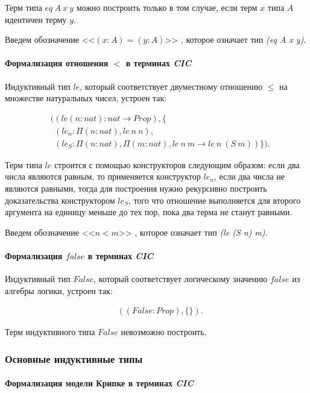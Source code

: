 \documentclass[12pt]{article}
\begin{document}
Терм типа $eq\ A\ x\ y$ можно построить только в том случае, если терм $x$ типа $A$ идентичен терму $y$.

Введем обозначение  <<$(x:A) = (y:A)$>> , которое означает тип \textit{(eq A x y)}.

\paragraph{Формализация отношения $<$ в терминах \textit{CIC}}\mbox{}

Индуктивный тип $le$, который соответствует двуместному отношению $\leq$ на множестве натуральных чисел, устроен так:

\begin{align*}
& ((le (n : nat): nat \xrightarrow{} Prop), \{ \\ 
& \ \ (le_n : \Pi(n:nat), le\ n\ n ), \\
& \ \ (le_S : \Pi(n:nat), \Pi(m : nat), le\ n\ m \xrightarrow{} le\ n\ (S\ m)) \}).
\end{align*}

Терм типа $le$ строится с помощью конструкторов следующим образом: если два числа являются равным, то применяется конструктор $le_n$, если два числа не являются равными, тогда для построения нужно рекурсивно построить доказательства конструктором $le_S$, того что отношение выполняется для второго аргумента на единицу меньше до тех пор, пока два терма не станут равными.

Введем обозначение  <<$n < m$>> , которое означает тип \textit{(le (S n) m)}.

\paragraph{Формализация $false$ в терминах \textit{CIC}}\mbox{}

Индуктивный тип $False$, который соответствует логическому значению $false$ из алгебры логики, устроен так:

\begin{align*}
& ((False : Prop), \{ \}).
\end{align*}

Терм индуктивного типа $False$ невозможно построить.

\subsubsection{Основные индуктивные типы}
\paragraph{Формализация модели Крипке в терминах \textit{CIC}}\mbox{}
\end{document}
